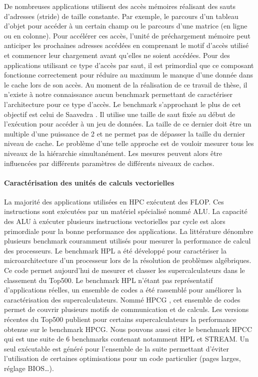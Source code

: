                 De nombreuses applications utilisent des accès mémoires réalisant des sauts d'adresses (stride) de taille constante. Par exemple, le parcours d'un tableau d'objet pour accéder à un certain champ ou le parcours d'une matrice (en ligne ou en colonne). Pour accélérer ces accès, l'unité de préchargement mémoire peut anticiper les prochaines adresses accédées en comprenant le motif d'accès utilisé et commencer leur chargement avant qu'elles ne soient accédées. Pour des applications utilisant ce type d'accès par saut, il est primordial que ce composant fonctionne correctement pour réduire au maximum le manque d'une donnée dans le cache lors de son accès.
                Au moment de la réalisation de ce travail de thèse, il n'existe à notre connaissance aucun benchmark permettant de caractériser l'architecture pour ce type d'accès. Le benchmark s'approchant le plus de cet objectif est celui de Saavedra  \cite{Saavedra1995}.  Il utilise une taille de saut fixée au début de l'exécution pour accéder à un jeu de données. La taille de ce dernier doit être un multiple d'une puissance de 2 et ne permet pas de dépasser la taille du dernier niveau de cache. Le problème d'une telle approche est de vouloir mesurer tous les niveaux de la hiérarchie simultanément. Les mesures peuvent alors être influencées par différents paramètres de différents niveaux de caches.
        
            \paragraph{Caractérisation des unités de calculs vectorielles}
            
                La majorité des applications utilisées en HPC exécutent des \gls{FLOP}. Ces instructions sont exécutées par un matériel spécialisé nommé \gls{ALU}. La capacité des ALU à exécuter plusieurs instructions vectorielles par cycle est alors primordiale pour la bonne performance des applications. La littérature dénombre plusieurs benchmark couramment utilisés pour mesurer la performance de calcul des processeurs. Le benchmark HPL  \cite{Dongarra2003} a été développé pour caractériser la microarchitecture d'un processeur lors de la résolution de problèmes algébriques. Ce code permet aujourd'hui de mesurer et classer les supercalculateurs dans le classement du Top500. Le benchmark HPL n'étant pas représentatif d'applications réelles, un ensemble de codes a été rassemblé pour améliorer la caractérisation des supercalculateurs. Nommé HPCG \cite{Dongarra2013}, cet ensemble de codes permet de couvrir plusieurs motifs de communication et de calculs. Les versions récentes du Top500 publient pour certains supercalculateurs la performance obtenue sur le benchmark HPCG. Nous pouvons aussi citer le benchmark HPCC \cite{Luszczek2006} qui est une suite de 6 benchmarks contenant notamment HPL et STREAM. Un seul exécutable est généré pour l'ensemble de la suite permettant d'éviter l'utilisation de certaines optimisations pour un code particulier (pages larges, réglage BIOS…). 

